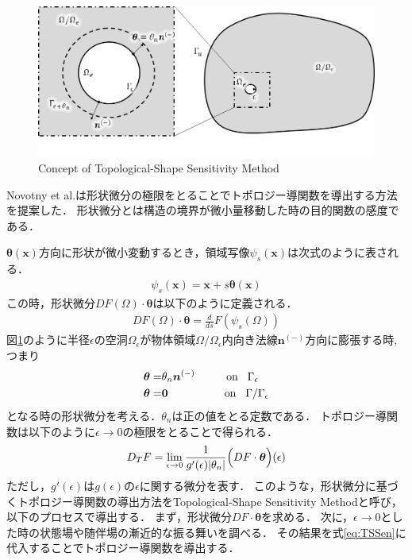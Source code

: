 \begin{figure}[ht]
	\begin{center}
		\includegraphics[width=13cm]{./figures/TSSM.png}
		\caption{Concept of Topological-Shape Sensitivity Method}
		\label{fig:TSSM}
	\end{center}
\end{figure}

Novotny et al.は形状微分の極限をとることでトポロジー導関数を導出する方法を提案した．
形状微分とは構造の境界が微小量移動した時の目的関数の感度である．

$\bm{\theta}(\bm{x})$方向に形状が微小変動するとき，領域写像$\psi_{s}(\bm{x})$は次式のように表される．
\begin{align}
\psi_{s}(\bm{x})=\bm{x}+s\bm{\theta}(\bm{x})
\end{align}
この時，形状微分$DF(\Omega)\cdot\bm{\theta}$は以下のように定義される．
\begin{align}
DF(\Omega)\cdot\bm{\theta}=\frac{d}{ds}F(\psi_{s}(\Omega))
\end{align}
図\ref{fig:TSSM}のように半径$\epsilon$の空洞$\Omega_{\epsilon}$が物体領域$\Omega/\Omega_{\epsilon}$内向き法線$\bm{n}^{(-)}$方向に膨張する時,つまり
\begin{align}
\bm{\theta}=&\theta_{n}\bm{n}^{(-)}	\hspace{1cm}\text{on}\hspace{0.3cm}\Gamma_{\epsilon}\\
\bm{\theta}=&\bm{0}					\hspace{1.8cm}\text{on}\hspace{0.3cm}\Gamma/\Gamma_{\epsilon}
\end{align}
となる時の形状微分を考える．$\theta_{n}$は正の値をとる定数である．
トポロジー導関数は以下のように$\epsilon\rightarrow0$の極限をとることで得られる．
\begin{align}
D_{T}F=\lim_{\epsilon\rightarrow 0}\frac{1}{g'(\epsilon)|\theta_{n}|}\Bigl(DF\cdot \bm{\theta}\Bigr)(\epsilon)
\label{eq:TSSen}
\end{align}
ただし，$g'(\epsilon)$は$g(\epsilon)$の$\epsilon$に関する微分を表す．
このような，形状微分に基づくトポロジー導関数の導出方法をTopological-Shape Sensitivity Methodと呼び，
以下のプロセスで導出する．
まず，形状微分$DF\cdot \bm{\theta}$を求める．
次に，$\epsilon\rightarrow0$とした時の状態場や随伴場の漸近的な振る舞いを調べる．
その結果を式\eqref{eq:TSSen}に代入することでトポロジー導関数を導出する．
